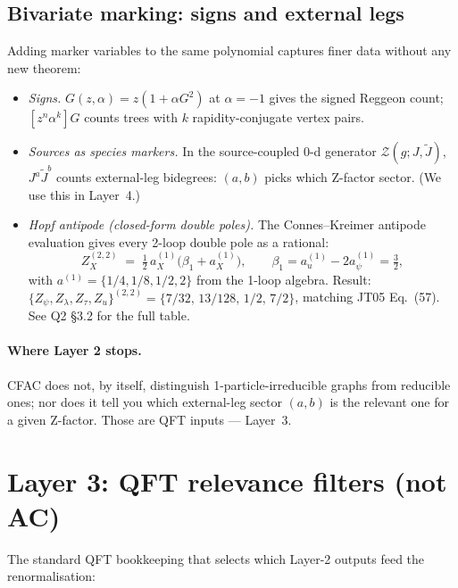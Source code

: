 \documentclass[11pt,a4paper]{article}
\begin{document}
\subsection{Bivariate marking: signs and external legs}

Adding marker variables to the same polynomial captures finer data without
any new theorem:
\begin{itemize}[leftmargin=2em,itemsep=2pt]
  \item \emph{Signs.} $G(z,\alpha)=z(1+\alpha G^2)$ at $\alpha=-1$ gives the
        signed Reggeon count; $[z^n\alpha^k]G$ counts trees with $k$
        rapidity-conjugate vertex pairs.
  \item \emph{Sources as species markers.} In the source-coupled 0-d generator
        $\mathcal{Z}(g; J,\tilde J)$, $J^a \tilde J^b$ counts external-leg
        bidegrees: $(a,b)$ picks which Z-factor sector. (We use this in
        Layer~4.)
  \item \emph{Hopf antipode (closed-form double poles).} The Connes--Kreimer
        antipode evaluation gives every 2-loop double pole as a rational:
        \[
        Z_X^{(2,2)} \;=\; \tfrac12\,a_X^{(1)}\bigl(\beta_1 + a_X^{(1)}\bigr),
        \qquad \beta_1 = a_u^{(1)} - 2a_\psi^{(1)} = \tfrac32,
        \]
        with $a^{(1)} = \{1/4, 1/8, 1/2, 2\}$ from the 1-loop algebra. Result:
        $\{Z_\psi, Z_\lambda, Z_\tau, Z_u\}^{(2,2)} = \{7/32,\,13/128,\,1/2,\,7/2\}$,
        matching JT05 Eq.~(57). See Q2 \S 3.2 for the full table.
\end{itemize}

\paragraph{Where Layer 2 stops.} CFAC does not, by itself, distinguish
1-particle-irreducible graphs from reducible ones; nor does it tell you
which external-leg sector $(a,b)$ is the relevant one for a given Z-factor.
Those are QFT inputs --- Layer~3.

\section{Layer 3: QFT relevance filters (not AC)}

The standard QFT bookkeeping that selects which Layer-2 outputs feed the
renormalisation:
\end{document}
